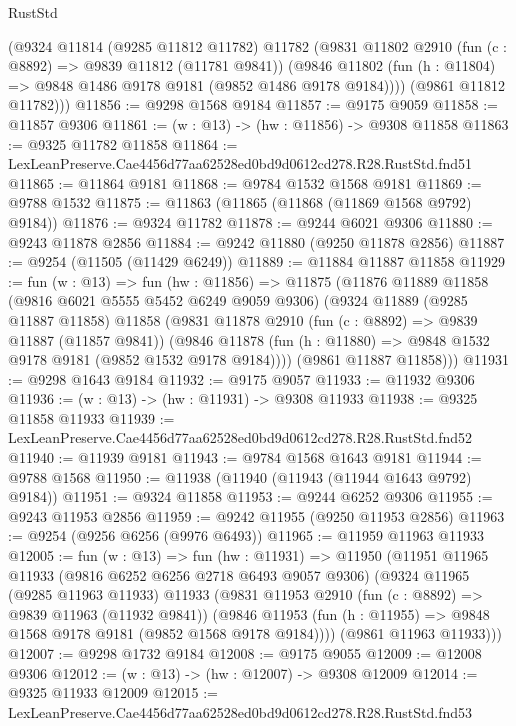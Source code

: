 \begin{lexlean}{RustStd}
\begin{coremodule}
      (@9324
        @11814
        (@9285 @11812 @11782)
        @11782
        (@9831
          @11802
          @2910
          (fun (c : @8892) => @9839 @11812 (@11781 @9841))
          (@9846 @11802 (fun (h : @11804) => @9848 @1486 @9178 @9181 (@9852 @1486 @9178 @9184))))
        (@9861 @11812 @11782)))
@11856 := @9298 @1568 @9184
@11857 := @9175 @9059
@11858 := @11857 @9306
@11861 := (w : @13) -> (hw : @11856) -> @9308 @11858
@11863 := @9325 @11782 @11858
@11864 := LexLeanPreserve.Cae4456d77aa62528ed0bd9d0612cd278.R28.RustStd.fnd51
@11865 := @11864 @9181
@11868 := @9784 @1532 @1568 @9181
@11869 := @9788 @1532
@11875 := @11863 (@11865 (@11868 (@11869 @1568 @9792) @9184))
@11876 := @9324 @11782
@11878 := @9244 @6021 @9306
@11880 := @9243 @11878 @2856
@11884 := @9242 @11880 (@9250 @11878 @2856)
@11887 := @9254 (@11505 (@11429 @6249))
@11889 := @11884 @11887 @11858
@11929 := fun (w : @13) =>
  fun (hw : @11856) =>
  @11875
    (@11876
      @11889
      @11858
      (@9816 @6021 @5555 @5452 @6249 @9059 @9306)
      (@9324
        @11889
        (@9285 @11887 @11858)
        @11858
        (@9831
          @11878
          @2910
          (fun (c : @8892) => @9839 @11887 (@11857 @9841))
          (@9846 @11878 (fun (h : @11880) => @9848 @1532 @9178 @9181 (@9852 @1532 @9178 @9184))))
        (@9861 @11887 @11858)))
@11931 := @9298 @1643 @9184
@11932 := @9175 @9057
@11933 := @11932 @9306
@11936 := (w : @13) -> (hw : @11931) -> @9308 @11933
@11938 := @9325 @11858 @11933
@11939 := LexLeanPreserve.Cae4456d77aa62528ed0bd9d0612cd278.R28.RustStd.fnd52
@11940 := @11939 @9181
@11943 := @9784 @1568 @1643 @9181
@11944 := @9788 @1568
@11950 := @11938 (@11940 (@11943 (@11944 @1643 @9792) @9184))
@11951 := @9324 @11858
@11953 := @9244 @6252 @9306
@11955 := @9243 @11953 @2856
@11959 := @9242 @11955 (@9250 @11953 @2856)
@11963 := @9254 (@9256 @6256 (@9976 @6493))
@11965 := @11959 @11963 @11933
@12005 := fun (w : @13) =>
  fun (hw : @11931) =>
  @11950
    (@11951
      @11965
      @11933
      (@9816 @6252 @6256 @2718 @6493 @9057 @9306)
      (@9324
        @11965
        (@9285 @11963 @11933)
        @11933
        (@9831
          @11953
          @2910
          (fun (c : @8892) => @9839 @11963 (@11932 @9841))
          (@9846 @11953 (fun (h : @11955) => @9848 @1568 @9178 @9181 (@9852 @1568 @9178 @9184))))
        (@9861 @11963 @11933)))
@12007 := @9298 @1732 @9184
@12008 := @9175 @9055
@12009 := @12008 @9306
@12012 := (w : @13) -> (hw : @12007) -> @9308 @12009
@12014 := @9325 @11933 @12009
@12015 := LexLeanPreserve.Cae4456d77aa62528ed0bd9d0612cd278.R28.RustStd.fnd53

\end{coremodule}
\end{lexlean}
